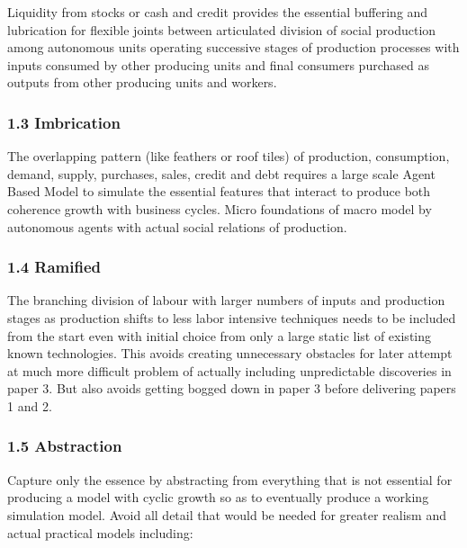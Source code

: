 \documentclass{article}
\begin{document}
Liquidity from stocks or cash and credit provides the essential
buffering and lubrication for flexible joints between articulated
division of social production among autonomous units operating
successive stages of production processes with inputs consumed by other
producing units and final consumers purchased as outputs from other
producing units and workers.

\hypertarget{imbrication}{%
\subsubsection{1.3 Imbrication}\label{imbrication}}

The overlapping pattern (like feathers or roof tiles) of production,
consumption, demand, supply, purchases, sales, credit and debt requires
a large scale Agent Based Model to simulate the essential features that
interact to produce both coherence growth with business cycles. Micro
foundations of macro model by autonomous agents with actual social
relations of production.

\hypertarget{ramified}{%
\subsubsection{1.4 Ramified}\label{ramified}}

The branching division of labour with larger numbers of inputs and
production stages as production shifts to less labor intensive
techniques needs to be included from the start even with initial choice
from only a large static list of existing known technologies. This
avoids creating unnecessary obstacles for later attempt at much more
difficult problem of actually including unpredictable discoveries in
paper 3. But also avoids getting bogged down in paper 3 before
delivering papers 1 and 2.

\hypertarget{abstraction}{%
\subsubsection{1.5 Abstraction}\label{abstraction}}

Capture only the essence by abstracting from everything that is not
essential for producing a model with cyclic growth so as to eventually
produce a working simulation model. Avoid all detail that would be
needed for greater realism and actual practical models including:
\end{document}
